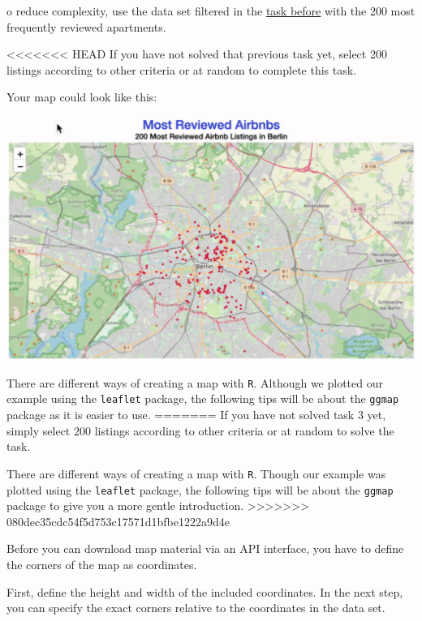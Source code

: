\documentclass[
  11pt,
]{article}
\newenvironment{tips}[1]
  {
  \begin{itemize}
  \footnotesize
  \renewcommand{\labelitemi}{
    \raisebox{-.7\height}[0pt][0pt]{
      {\setkeys{Gin}{width=3em,keepaspectratio}
        \texttt{[image: images/\#1.png]}}
    }
  }
  \setlength{\fboxsep}{1em}
  \begin{rbox}
  \item
  }
  {
  \end{rbox}
  \end{itemize}
  }
\begin{document}
\begin{tips}
To reduce complexity, use the data set filtered in the \href{https://tech-academy-ev.github.io/exploratory-data-analysis.html\#your-first-barplot}{task before} with the 200 most frequently reviewed apartments.

<<<<<<< HEAD
If you have not solved that previous task yet, select 200 listings according to other criteria or at random to complete this task.

Your map could look like this:

\begin{center}\includegraphics[width=1\linewidth]{plot/01_python/map_circles} \end{center}

\begin{tips}r
There are different ways of creating a map with \texttt{R}.
Although we plotted our example using the \texttt{leaflet} package, the following tips will be about the \texttt{ggmap} package as it is easier to use.
=======
If you have not solved task 3 yet, simply select 200 listings according to other criteria or at random to solve the task.

\begin{tips}r
There are different ways of creating a map with \texttt{R}. Though our example was plotted using the \texttt{leaflet} package, the following tips will be about the \texttt{ggmap} package to give you a more gentle introduction.
>>>>>>> 080dec35cdc54f5d753c17571d1bfbe1222a9d4e

Before you can download map material via an API interface, you have to define the corners of the map as coordinates.

First, define the height and width of the included coordinates.
In the next step, you can specify the exact corners relative to the coordinates in the data set.


\end{tips}
\end{tips}
\end{tips}
\end{document}
